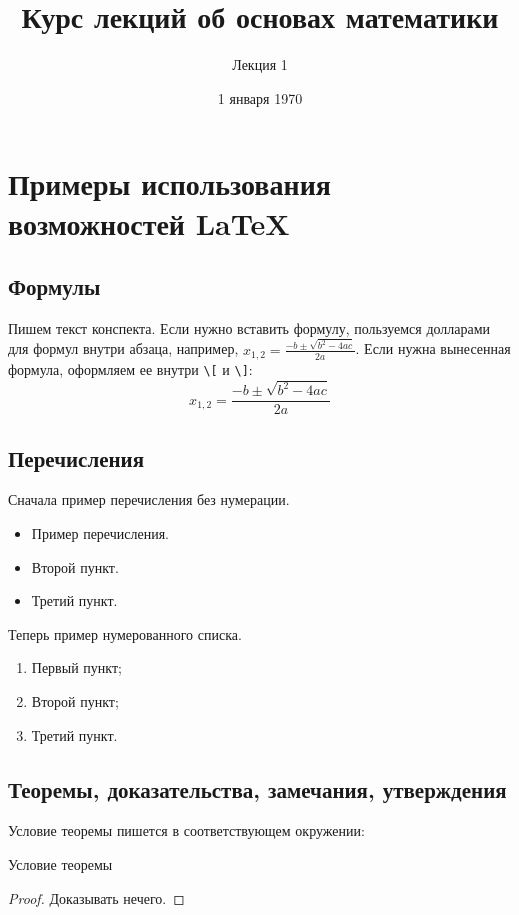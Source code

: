 \documentclass[russian]{lecture-notes}
\title{Курс лекций об основах математики}
\subtitle{Лекция 1}
\date{1 января 1970}
\begin{document}
\maketitle

\section{Примеры использования возможностей \LaTeX}
\subsection{Формулы}

Пишем текст конспекта.
Если нужно вставить формулу, пользуемся долларами для формул внутри абзаца,
например, $x_{1,2}=\frac{-b\pm\sqrt{b^2-4ac}}{2a}$.
Если нужна вынесенная формула, оформляем ее внутри
\texttt{\textbackslash[} и \texttt{\textbackslash]}:
\[x_{1,2}=\frac{-b\pm\sqrt{b^2-4ac}}{2a}\]

\subsection{Перечисления}

Сначала пример перечисления без нумерации.

\begin{itemize}
    \item Пример перечисления.
    \item Второй пункт.
    \item Третий пункт.
\end{itemize}
Теперь пример нумерованного списка.
\begin{enumerate}
    \item Первый пункт;
    \item Второй пункт;
    \item Третий пункт.
\end{enumerate}

\subsection{Теоремы, доказательства, замечания, утверждения}

Условие теоремы пишется в соответствующем окружении:

\begin{theorem}
    Условие теоремы
\end{theorem}
\begin{proof}
    Доказывать нечего.
\end{proof}
\end{document}
